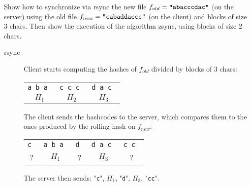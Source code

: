 \exercise

Show how to synchronize via rsync the new file $f_{old} = \text{\tt
“abacccdac”}$ (on the server) using the old file $f_{new} = \text{\tt
“cabaddaccc”}$ (on the client) and blocks of size 3 chars. Then show the
execution of the algorithm zsync, using blocks of size 2 chars.

\solution

\begin{description}

  \item[rsync] Client starts computing the hashes of $f_{old}$ divided by blocks
  of 3 chars:
  \begin{table}[h]
    \centering
    \begin{tabular}{|c|c|c|}
      \tt{a b a} & \tt{c c c} & \tt{d a c} \\
      $H_1$ & $H_2$ & $H_3$ \\
    \end{tabular}
  \end{table}
  The client sends the hashcodes to the server, which compares them to the ones
  produced by the rolling hash on $f_{new}$:
  \begin{table}[H]
    \centering
    \begin{tabular}{|c|c|c|c|c|}
      \tt{c} & \tt{a b a} & \tt{d} & \tt{d a c} & \tt{c c} \\
      ? & $H_1$ & ? & $H_3$ & ? \\
    \end{tabular}
  \end{table}
  The server then sends: "{\tt c}", $H_1$, "{\tt d}", $H_3$, "{\tt cc}".


\end{description}
